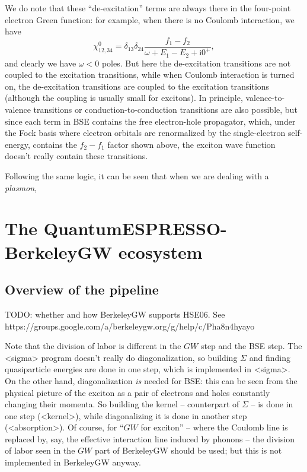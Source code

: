 \documentclass[hyperref, a4paper, 12pt]{report}
\newcommand*{\ii}{\mathrm{i}}
\def\texttt#1{<#1>}%
\newcommand{\shortcode}[1]{\texttt{#1}}
\begin{document}
We do note that these ``de-excitation'' terms are always there in the four-point electron Green function:
for example, when there is no Coulomb interaction, we have 
\[
    \chi^0_{12,34} = \delta_{1 3} \delta_{2 4} \frac{f_1 - f_2}{\omega + E_1 - E_2 + \ii 0^+},
\]
and clearly we have $\omega < 0$ poles.
But here the de-excitation transitions are not coupled to the excitation transitions,
while when Coulomb interaction is turned on, the de-excitation transitions are coupled to the excitation transitions
(although the coupling is usually small for excitons).
In principle, valence-to-valence transitions or conduction-to-conduction transitions are also possible,
but since each term in BSE contains the free electron-hole propagator,
which, under the Fock basis where electron orbitals are renormalized by the single-electron self-energy,
contains the $f_2 - f_1$ factor shown above,
the exciton wave function doesn't really contain these transitions. 

Following the same logic, it can be seen that when we are dealing with a \emph{plasmon},


\chapter{The QuantumESPRESSO-BerkeleyGW ecosystem}

\section{Overview of the pipeline}

TODO: whether and how BerkeleyGW supports HSE06.
See https://groups.google.com/a/berkeleygw.org/g/help/c/Pha8n4hyayo

Note that the division of labor is different in the $GW$ step and the BSE step.
The \shortcode{sigma} program doesn't really do diagonalization,
so building $\Sigma$ and finding quasiparticle energies 
are done in one step, which is implemented in \shortcode{sigma}.
On the other hand, 
diagonalization \emph{is} needed for BSE: 
this can be seen from the physical picture of the exciton
as a pair of electrons and holes constantly changing their momenta.
So building the kernel -- counterpart of $\Sigma$ -- 
is done in one step (\shortcode{kernel}),
while diagonalizing it is done in another step (\shortcode{absorption}).
Of course, for ``$GW$ for exciton'' -- 
where the Coulomb line is replaced by, say, 
the effective interaction line induced by phonons --
the division of labor seen in the $GW$ part of BerkeleyGW should be used; 
but this is not implemented in BerkeleyGW anyway.
\end{document}
